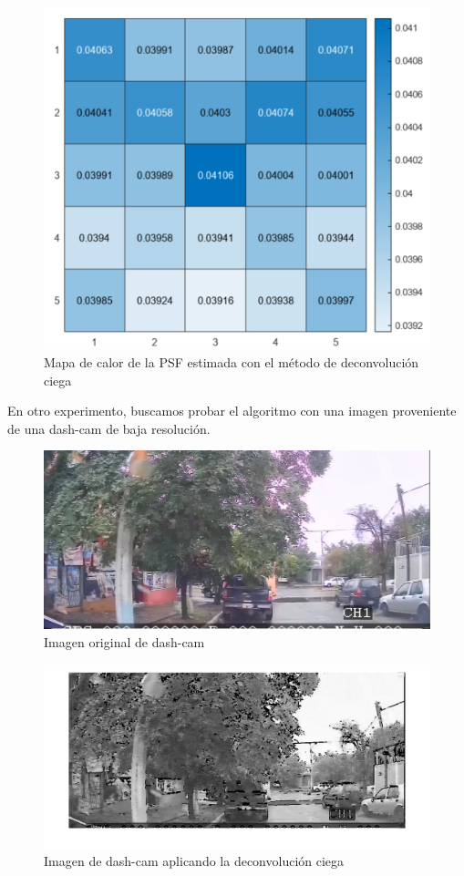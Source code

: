\documentclass[eng]{ajceam-class}
\begin{document}
\begin{figure}[!h] 
 \centering
 \includegraphics[width=.7\columnwidth]{PSF_estimada.png} 
 \caption{Mapa de calor de la PSF estimada con el método de deconvolución ciega} \label{fig-1}
\end{figure}


En otro experimento, buscamos probar el algoritmo con una imagen proveniente de una dash-cam de baja resolución. 

\begin{figure}[!h] 
 \centering
 \includegraphics[width=.7\columnwidth]{dashcam_1.png} 
 \caption{Imagen original de dash-cam} \label{fig-1}
\end{figure}

\begin{figure}[!h] 
 \centering
 \includegraphics[width=.7\columnwidth]{dahscam_deconv_1.png} 
 \caption{Imagen de dash-cam aplicando la deconvolución ciega} \label{fig-1}
\end{figure}
\end{document}
